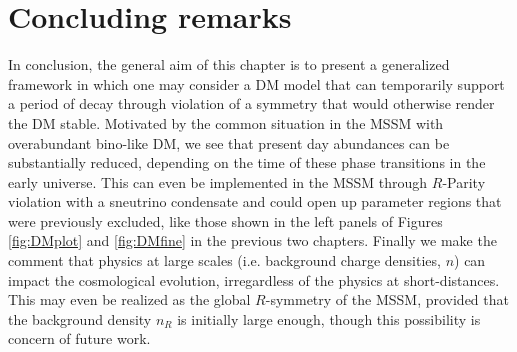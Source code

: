 \section{Concluding remarks}

In conclusion, the general aim of this chapter is to present a generalized framework in which one may consider a DM model that can temporarily support a period of decay through violation of a symmetry that would otherwise render the DM stable. Motivated by the common situation in the MSSM with overabundant bino-like DM, we see that present day abundances can be substantially reduced, depending on the time of these phase transitions in the early universe. This can even be implemented in the MSSM through $R$-Parity violation with a sneutrino condensate and could open up parameter regions that were previously excluded, like those shown in the left panels of Figures \ref{fig:DMplot} and \ref{fig:DMfine} in the previous two chapters. Finally we make the comment that physics at large scales (i.e. background charge densities, $n$) can impact the cosmological evolution, irregardless of the physics at short-distances. This may even be realized as the global $R$-symmetry of the MSSM, provided that the background density $n_R$ is initially large enough, though this possibility is concern of future work.

